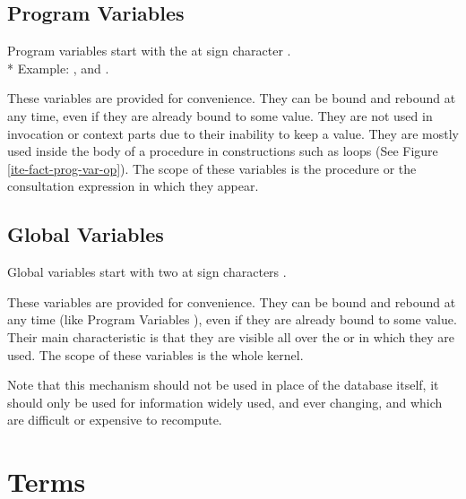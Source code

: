 \subsection{Program Variables}

Program variables start with the at sign character .\\*
Example: ,  and .


These variables are provided for convenience. They can be bound and rebound
at any time, even if they are already bound to some value. They are not
used in invocation or context parts due to their inability to keep a
value. They are mostly used inside the body of a procedure in constructions
such as loops (See Figure \ref{ite-fact-prog-var-op}).
The scope of these variables is the procedure or the consultation expression in
which they appear.

\subsection{Global Variables}

Global variables start with two at sign characters .

These variables are provided for convenience. They can be bound and rebound
at any time (like Program Variables ), even if
they are already bound to some value. Their main characteristic is that
they are visible all over the \CPK{} or \XPK{} in which they are used.
The scope of these variables is the whole kernel.

Note that this mechanism should not be used in place of the database itself, it
should only be used for information widely used, and ever changing, and which
are difficult or expensive to recompute.

\section{Terms}

